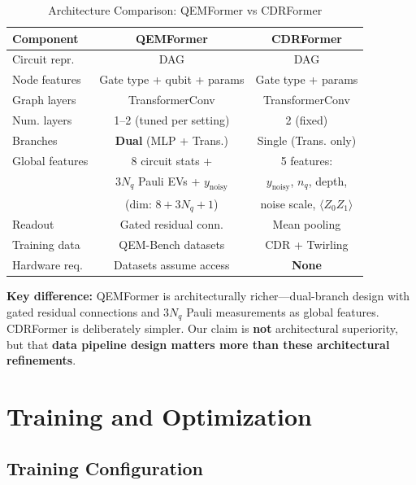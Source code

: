 \documentclass[11pt, a4paper]{article}
\begin{document}
\begin{table}[H]
\centering
\caption{Architecture Comparison: QEMFormer vs CDRFormer}
\label{tab:arch_comparison}
\begin{tabular}{@{}lcc@{}}
\toprule
\textbf{Component} & \textbf{QEMFormer} & \textbf{CDRFormer} \\ \midrule
Circuit repr. & DAG & DAG \\
Node features & Gate type + qubit + params & Gate type + params \\
Graph layers & TransformerConv & TransformerConv \\
Num. layers & 1--2 (tuned per setting) & 2 (fixed) \\
Branches & \textbf{Dual} (MLP + Trans.) & Single (Trans. only) \\
Global features & 8 circuit stats + & 5 features: \\
 & $3N_q$ Pauli EVs + $y_{\text{noisy}}$ & $y_{\text{noisy}}$, $n_q$, depth, \\
 & (dim: $8+3N_q+1$) & noise scale, $\langle Z_0Z_1\rangle$ \\
Readout & Gated residual conn. & Mean pooling \\
Training data & QEM-Bench datasets & CDR + Twirling \\
Hardware req. & Datasets assume access & \textbf{None} \\
\bottomrule
\end{tabular}
\end{table}

\textbf{Key difference:} QEMFormer is architecturally richer---dual-branch
design with gated residual connections and $3N_q$ Pauli measurements as
global features. CDRFormer is deliberately simpler. Our claim is
\textbf{not} architectural superiority, but that \textbf{data pipeline
design matters more than these architectural refinements}.

\section{Training and Optimization}
\label{sec:training}

\subsection{Training Configuration}
\end{document}
